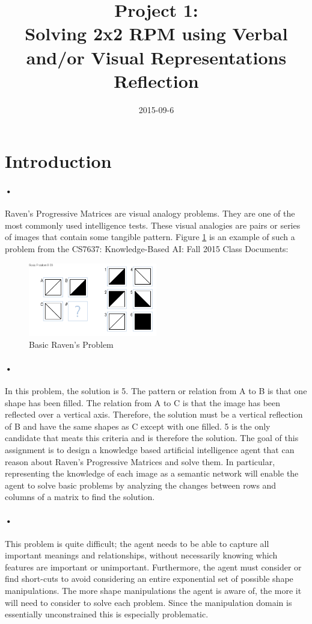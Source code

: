 \documentclass[12pt]{article}
\title{Project 1:\\Solving 2x2 RPM using Verbal and/or Visual Representations \\ Reflection}
\date{2015-09-6}
\begin{document}
	\maketitle
	\newpage
\section{Introduction}
	\paragraph{•}
	Raven's Progressive Matrices are visual analogy problems. They are one of the most commonly used intelligence tests. \cite{kaplan2009standardized} These visual analogies are pairs or series of images that contain some tangible pattern. Figure \ref{fig:b-06} is an example of such a problem from the CS7637: Knowledge-Based AI: Fall 2015 Class Documents:
	\begin{figure}[H]
	\centering
	\includegraphics[width=0.5\textwidth]{Basic-Problem-B-06-2.png}
	 \caption{Basic Raven's Problem}
	 \label{fig:b-06}
	\end{figure}
	\paragraph{•}
	In this problem, the solution is 5. The pattern or relation from A to B is that one shape has been filled. The relation from A to C is that the image has been reflected over a vertical axis. Therefore, the solution must be a vertical reflection of B and have the same shapes as C except with one filled. 5 is the only candidate that meats this criteria and is therefore the solution. The goal of this assignment is to design a knowledge based artificial intelligence agent that can reason about Raven's Progressive Matrices and solve them. In particular, representing the knowledge of each image as a semantic network will enable the agent to solve basic problems by analyzing the changes between rows and columns of a matrix to find the solution.
	 \paragraph{•}
	 This problem is quite difficult; the agent needs to be able to capture all important meanings and relationships, without necessarily knowing which features are important or unimportant. Furthermore, the agent must consider or find short-cuts to avoid considering an entire exponential set of possible shape manipulations. The more shape manipulations the agent is aware of, the more it will need to consider to solve each problem. Since the manipulation domain is essentially unconstrained this is especially problematic.
\end{document}
